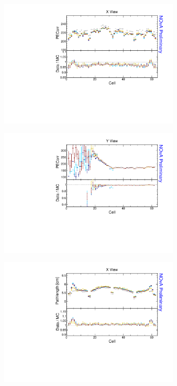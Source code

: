\begin{figure}[!ht]
\begin{subfigure}{0.495\textwidth}
  \end{subfigure}
  \begin{subfigure}{0.495\textwidth}
    \includegraphics[width=\linewidth]{essentialsec_tb/pecorr_cell_x.pdf}
  \end{subfigure}
  \begin{subfigure}{0.495\textwidth}
    \includegraphics[width=\linewidth]{essentialsec_tb/pecorr_cell_y.pdf}
  \end{subfigure}
  \begin{subfigure}{0.495\textwidth}
    \includegraphics[width=\linewidth]{essentialsec_tb/cm_cell_x.pdf}

\end{subfigure}
\end{figure}
